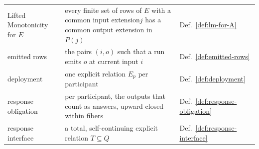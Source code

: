 \documentclass[sigconf]{cidr-2027}
\theoremstyle{remark}
\newcommand{\indesc}{input extension\xspace} %
\newcommand{\outnoun}{output extension\xspace}%
\newcommand{\fiber}[1]{P(#1)}
\begin{document}
{\begin{tabular}{@{}>{\raggedright\arraybackslash}p{}>{\raggedright\arraybackslash}p{}>{\raggedright\arraybackslash}p{}@{}}
  Lifted Monotonicity for $E$ & every finite set of rows of $E$ with a common \indesc $j$ has a common \outnoun in $\fiber{j}$ & Def.~\ref{def:lm-for-A}\\
  emitted rows & the pairs $(i,o)$ such that a run emits $o$ at current input $i$ & Def.~\ref{def:emitted-rows}\\
  deployment & one explicit relation $E_p$ per participant & Def.~\ref{def:deployment}\\
  response obligation & per participant, the outputs that count as answers, upward closed within fibers & Def.~\ref{def:response-obligation}\\
  response interface & a total, self-continuing explicit relation $T\subseteq Q$ & Def.~\ref{def:response-interface}\\
  \bottomrule
\end{tabular}

}
\end{document}
